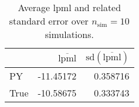 \begin{table}[H]

\caption{Average lpml and related standard error over $n_{\text{sim}} = 10$ simulations.}
\centering
\begin{tabular}[t]{lrr}
\toprule
  & $\overbar{\text{lpml}}$ & $\text{sd}(\overbar{\text{lpml}})$\\
\midrule
PY & -11.45172 & 0.358716\\
True & -10.58675 & 0.333743\\
\bottomrule
\end{tabular}
\end{table}